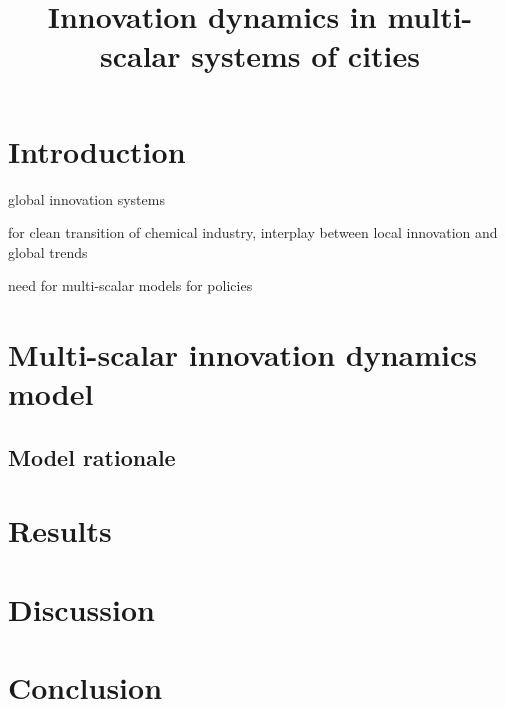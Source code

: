 \documentclass[letterpaper]{article}
\title{Innovation dynamics in multi-scalar systems of cities}
\author{}
\begin{document}
\maketitle

\begin{abstract}
  
\end{abstract}


\section{Introduction}



% 
\cite{binz2017global} global innovation systems

\cite{bauer2019local} for clean transition of chemical industry, interplay between local innovation and global trends

\cite{rozenblat2018conclusion} need for multi-scalar models for policies

\cite{rozenblat2007firm}


\cite{raimbault2021multiscale}

\cite{raimbault2021strong}


\cite{seth2010measuring} 

\cite{rosas2020reconciling}


\section{Multi-scalar innovation dynamics model}

\subsection{Model rationale}

\cite{raimbault2022innovation}

\cite{raimbault2020model}





\section{Results}



\section{Discussion}



\section{Conclusion}




\footnotesize


\end{document}
